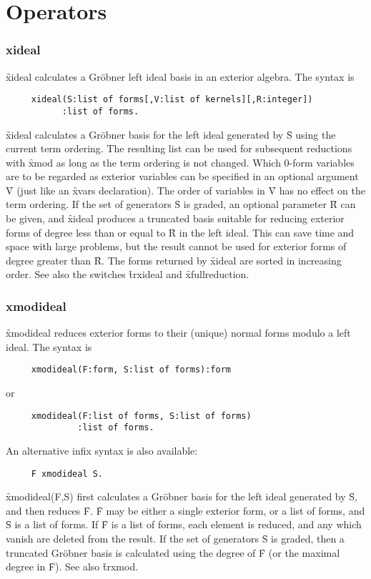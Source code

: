 \section{Operators}


\subsubsection*{xideal}

\f{xideal} calculates a Gr{\"o}bner left ideal basis in
an exterior algebra. The syntax is
\begin{verbatim}
     xideal(S:list of forms[,V:list of kernels][,R:integer])
           :list of forms.
\end{verbatim}
\f{xideal} calculates a Gr{\"o}bner basis for the left ideal generated by
\f{S} using the current term ordering. The resulting list can be used for
subsequent reductions with \f{xmod} as long as the term ordering is not
changed. Which 0-form variables are to be regarded as exterior variables
can be specified in an optional argument \f{V} (just like an \f{xvars}
declaration). The order of variables in \f{V} has no effect on the term
ordering. If the set of generators \f{S} is graded, an optional parameter
\f{R} can be given, and \f{xideal} produces a truncated basis suitable for
reducing exterior forms of degree less than or equal to \f{R} in the left
ideal. This can save time and space with large problems, but the result
cannot be used for exterior forms of degree greater than \f{R}. The forms
returned by \f{xideal} are sorted in increasing order. See also the
switches \f{trxideal} and \f{xfullreduction}.


\subsubsection*{xmodideal}

\f{xmodideal} reduces exterior forms to their (unique) normal forms modulo
a left ideal. The syntax is
\begin{verbatim}
     xmodideal(F:form, S:list of forms):form
\end{verbatim}
or
\begin{verbatim}
     xmodideal(F:list of forms, S:list of forms)
              :list of forms.
\end{verbatim}
An alternative infix syntax is also available:
\begin{verbatim}
     F xmodideal S.
\end{verbatim}
\f{xmodideal(F,S)} first calculates a Gr{\"o}bner basis for the left ideal
generated by \f{S}, and then reduces \f{F}. \f{F} may be either a single
exterior form, or a list of forms, and \f{S} is a list of forms. If \f{F}
is a list of forms, each element is reduced, and any which vanish are
deleted from the result. 
If the set of generators \f{S} is graded, then a truncated Gr{\"o}bner basis
is calculated using the degree of \f{F} (or the maximal degree in
\f{F}). See also \f{trxmod}.


